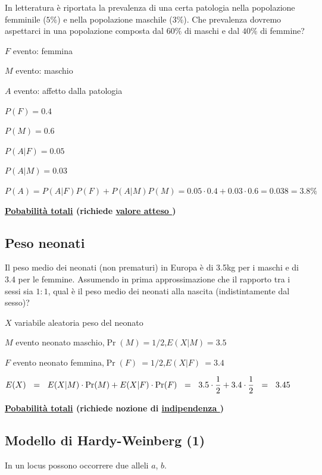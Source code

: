 \documentclass[12pt,openany]{book}
\theoremstyle{mio}
\theoremstyle{liscio}
\begin{document}
In letteratura è riportata la prevalenza di una certa patologia nella popolazione femminile ($5\%$) e nella popolazione maschile ($3\%$). Che prevalenza dovremo aspettarci in una popolazione composta dal $60\%$ di maschi e dal $40\%$ di femmine?

$F$ evento: femmina

$M$ evento: maschio

$A$ evento: affetto dalla patologia

$P(F)=0.4$

$P(M)=0.6$

$P(A|F)=0.05$

$P(A|M)=0.03$

$P(A)=P(A|F)P(F)+P(A|M)P(M)=0.05\cdot0.4+0.03\cdot0.6=0.038=3.8\%$


\hfill{}\clearpage
\hfill\textbf{{\color{brown}\hyperref[TeoremaProbabilitaTotali]{Pobabilità totali} \faShare} (richiede \hyperref[ValoreAtteso]{valore atteso \faShare})}
\subsection{Peso neonati}
\label{Neonati_totali}

Il peso medio dei neonati (non prematuri) in Europa è di 3.5kg per i maschi e di 3.4 per le femmine. Assumendo in prima approssimazione che il rapporto tra i sessi sia $1:1$, qual è il peso medio dei neonati alla nascita (indistintamente dal sesso)?

$X$ variabile aleatoria peso del neonato

$M$ evento neonato maschio,\quad $\Pr(M)=1/2$,\quad $E(X|M)=3.5$

$F$ evento neonato femmina,\quad $\Pr(F)\ =1/2$,\quad $E(X|F)\ =3.4$


$E(X)\medrel{=}E(X|M)\cdot\Pr(M)+ E(X|F)\cdot\Pr(F)\medrel{=}3.5\cdot\dfrac12 + 3.4\cdot\dfrac12\medrel{=}3.45$



\hfill{}\clearpage
\hfill\textbf{{\color{brown}\hyperref[TeoremaProbabilitaTotali]{Pobabilità totali} \faShare} (richiede nozione di \hyperref[indipendenza]{indipendenza \faShare})}

\subsection{Modello di Hardy-Weinberg (1)}
\label{HW_totali1}

In un locus possono occorrere due alleli $a$, $b$. 
\end{document}

